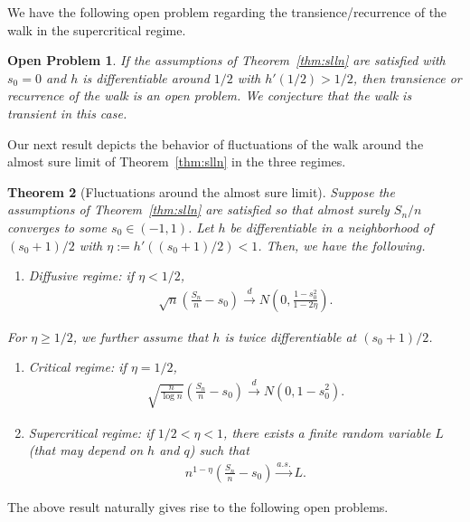 \documentclass[12pt]{amsart}
\theoremstyle{plain}
\newtheorem{theorem}{Theorem}[section]
\newtheorem{conjecture}[theorem]{Open Problem}
\theoremstyle{remark}
\numberwithin{equation}{section}
\begin{document}
We have the following open problem regarding the transience/recurrence of the walk in the supercritical regime.
\begin{conjecture}\label{conj1}
    If the assumptions of Theorem~\ref{thm:slln} are satisfied with $s_0 = 0$ and $h$ is differentiable around $1/2$ with $h'(1/2) > 1/2$, then transience or recurrence of the walk is an open problem. We conjecture that the walk is transient in this case. 
\end{conjecture}

Our next result depicts the behavior of fluctuations of the walk around the almost sure limit of Theorem~\ref{thm:slln}  in the three regimes.

\begin{theorem}[Fluctuations around the almost sure limit]\label{thm:clt}
Suppose the assumptions of Theorem~\ref{thm:slln} are satisfied so that almost surely ${S_n}/{n}$ converges to some $s_0\in (-1,1)$. Let $h$ be differentiable in a neighborhood of $(s_0+1)/2$ 
with $\eta := h'((s_0+1)/2) < 1$. Then, we have the following.
\begin{enumerate}
\item[a)] Diffusive regime: if $\eta < {1}/{2}$, 
\begin{align}\label{eq:clt-ldrw1}
    \sqrt{n}\left(\frac{S_n}{n} - s_0\right) \stackrel{d}{\to} N\left(0,\frac{1-s^2_0}{1-2\eta}\right).
\end{align}
\end{enumerate}

For $\eta \geq 1/2$, we further assume that $h$ is twice differentiable at $(s_0+1)/2$.

\begin{enumerate}
\item[b)] Critical regime: if $\eta = {1}/{2}$, 
\begin{align}\label{eq:clt-ldrw2}
    \sqrt{\frac{n}{\log n}}\left(\frac{S_n}{n} - s_0\right) \stackrel{d}{\to} N\left(0,1-s^2_0\right).
\end{align}
\item[c)] Supercritical regime: if $1/2 < \eta < 1$, there exists a finite random variable $L$ (that may depend on $h$ and $q$) such that
\begin{align}\label{eq:clt-ldrw3}
    n^{1-\eta}\left(\frac{S_n}{n} - s_0\right) \stackrel{a.s.}{\to} L.
\end{align}
\end{enumerate}
\end{theorem}

The above result naturally gives rise to the following open problems. 
\end{document}
